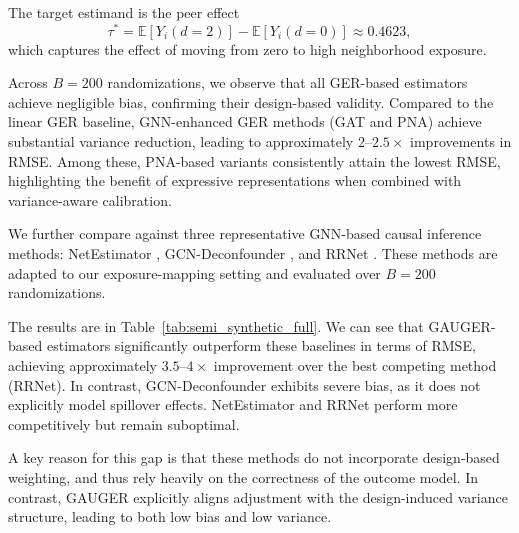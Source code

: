 \documentclass[twoside,letterpaper]{article}
\theoremstyle{plain}
\theoremstyle{definition}
\theoremstyle{remark}
\begin{document}
The target estimand is the peer effect
\[
\tau^* = \mathbb{E}[Y_i(d{=}2)] - \mathbb{E}[Y_i(d{=}0)] \approx 0.4623,
\]
which captures the effect of moving from zero to high neighborhood exposure.

Across $B=200$ randomizations, we observe that all GER-based estimators achieve negligible bias, confirming their design-based validity. Compared to the linear GER baseline, GNN-enhanced GER methods (GAT and PNA) achieve substantial variance reduction, leading to approximately $2$--$2.5\times$ improvements in RMSE. Among these, PNA-based variants consistently attain the lowest RMSE, highlighting the benefit of expressive representations when combined with variance-aware calibration.

We further compare against three representative GNN-based causal inference methods: NetEstimator \citep{jiang2022estimating}, GCN-Deconfounder \citep{guo2020learning}, and RRNet \citep{cai2023generalization}. These methods are adapted to our exposure-mapping setting and evaluated over $B=200$ randomizations.

The results are in Table~\ref{tab:semi_synthetic_full}. We can see that GAUGER-based estimators significantly outperform these baselines in terms of RMSE, achieving approximately $3.5$--$4\times$ improvement over the best competing method (RRNet). In contrast, GCN-Deconfounder exhibits severe bias, as it does not explicitly model spillover effects. NetEstimator and RRNet perform more competitively but remain suboptimal.

A key reason for this gap is that these methods do not incorporate design-based weighting, and thus rely heavily on the correctness of the outcome model. In contrast, GAUGER explicitly aligns adjustment with the design-induced variance structure, leading to both low bias and low variance.
\end{document}
